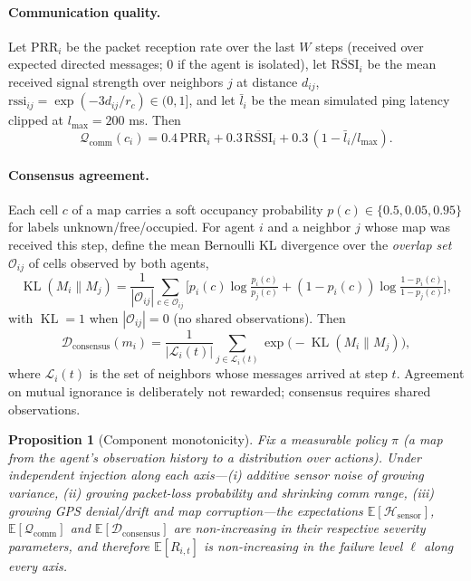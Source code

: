 \documentclass[12pt,a4paper]{article}
\DeclareRobustCommand{\cH}{\mathcal{H}}
\DeclareRobustCommand{\cQ}{\mathcal{Q}}
\DeclareRobustCommand{\cD}{\mathcal{D}}
\DeclareRobustCommand{\cL}{\mathcal{L}}
\DeclareRobustCommand{\cO}{\mathcal{O}}
\DeclareRobustCommand{\E}{\mathbb{E}}
\DeclareMathOperator{\KL}{KL}
\newtheorem{proposition}[theorem]{Proposition}
\begin{document}
\paragraph{Communication quality.}
Let $\mathrm{PRR}_i$ be the packet reception rate over the last $W$ steps
(received over expected directed messages; $0$ if the agent is isolated), let
$\overline{\mathrm{RSSI}}_i$ be the mean received signal strength over
neighbors $j$ at distance $d_{ij}$,
$\mathrm{rssi}_{ij} = \exp(-3 d_{ij}/r_c) \in (0,1]$, and let $\bar l_i$ be the
mean simulated ping latency clipped at $l_{\max} = 200$ ms. Then
\begin{equation}
\cQ_{\mathrm{comm}}(c_i)
= 0.4\,\mathrm{PRR}_i + 0.3\,\overline{\mathrm{RSSI}}_i
+ 0.3\,(1 - \bar l_i/l_{\max}).
\label{eq:qcomm}
\end{equation}

\paragraph{Consensus agreement.}
Each cell $c$ of a map carries a soft occupancy probability
$p(c) \in \{0.5, 0.05, 0.95\}$ for labels unknown/free/occupied. For agent $i$
and a neighbor $j$ whose map was received this step, define the mean Bernoulli
KL divergence over the \emph{overlap set} $\cO_{ij}$ of cells observed by both
agents,
\begin{equation}
\KL(M_i \| M_j)
= \frac{1}{|\cO_{ij}|} \sum_{c \in \cO_{ij}}
\Big[p_i(c)\log\tfrac{p_i(c)}{p_j(c)}
+ (1-p_i(c))\log\tfrac{1-p_i(c)}{1-p_j(c)}\Big],
\label{eq:kl}
\end{equation}
with $\KL = 1$ when $|\cO_{ij}| = 0$ (no shared observations). Then
\begin{equation}
\cD_{\mathrm{consensus}}(m_i)
= \frac{1}{|\cL_i(t)|} \sum_{j \in \cL_i(t)} \exp\big(-\KL(M_i \| M_j)\big),
\label{eq:dconsensus}
\end{equation}
where $\cL_i(t)$ is the set of neighbors whose messages arrived at step $t$.
Agreement on mutual ignorance is deliberately not rewarded; consensus
requires shared observations.

\begin{proposition}[Component monotonicity]
\label{prop:monotone}
Fix a measurable policy $\pi$ (a map from the agent's observation history to a
distribution over actions). Under independent injection along each axis---(i)
additive sensor noise of growing variance, (ii) growing packet-loss
probability and shrinking comm range, (iii) growing GPS denial/drift and map
corruption---the expectations $\E[\cH_{\mathrm{sensor}}]$,
$\E[\cQ_{\mathrm{comm}}]$ and $\E[\cD_{\mathrm{consensus}}]$ are
non-increasing in their respective severity parameters, and therefore
$\E[R_{i,t}]$ is non-increasing in the failure level $\ell$ along every axis.
\end{proposition}
\end{document}

